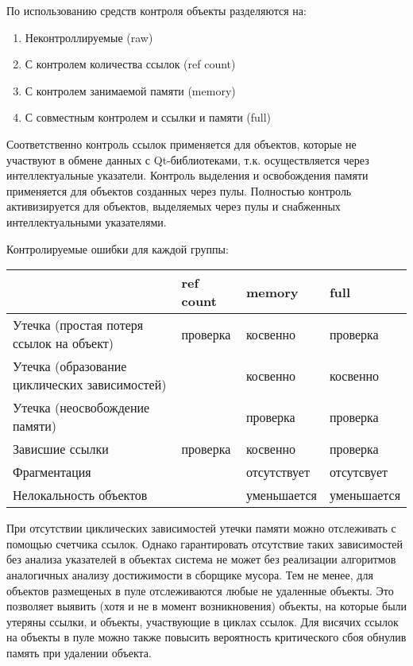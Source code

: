 \documentclass{article}
\begin{document}
По использованию средств контроля объекты разделяются на:
\begin{enumerate}
\item  Неконтроллируемые (raw)

\item  С контролем количества ссылок (ref count)

\item  С контролем занимаемой памяти (memory)

\item  С совместным контролем и ссылки и памяти (full)
\end{enumerate}
Соответственно контроль ссылок применяется для объектов, которые не участвуют в обмене данных с Qt-библиотеками, т.к. осуществляется через интеллектуальные указатели. Контроль выделения и освобождения памяти применяется для объектов созданных через пулы. Полностью контроль активизируется для объектов, выделяемых через пулы и снабженных интеллектуальными указателями.

Контролируемые ошибки для каждой группы:

\begin{tabular}{|p{1.9in}|p{0.6in}|p{0.8in}|p{0.8in}|} 
\hline & ref count & memory & full \\
\hline Утечка (простая потеря ссылок на объект)  & проверка & косвенно & проверка \\ 
\hline Утечка (образование циклических зависимостей)  &  & косвенно & косвенно \\
\hline Утечка (неосвобождение памяти)  &  & проверка & проверка \\
\hline Зависшие ссылки  & проверка & косвенно & проверка \\
\hline Фрагментация  &  & отсутствует & отсутсвует \\
\hline Нелокальность объектов &  & уменьшается & уменьшается \\ \hline
\end{tabular}

При отсутствии циклических зависимостей утечки памяти можно отслеживать с помощью счетчика ссылок. Однако гарантировать отсутствие таких зависимостей без анализа указателей в объектах система не может без реализации алгоритмов аналогичных анализу достижимости в сборщике мусора.  Тем не менее, для объектов размещеных в пуле отслеживаются любые не удаленные объекты. Это позволяет выявить (хотя и не в момент возникновения) объекты, на которые были утеряны ссылки, и объекты, участвующие в циклах ссылок. Для висячих ссылок на объекты в пуле можно также повысить вероятность критического сбоя обнулив память при удалении объекта.  
\end{document}
